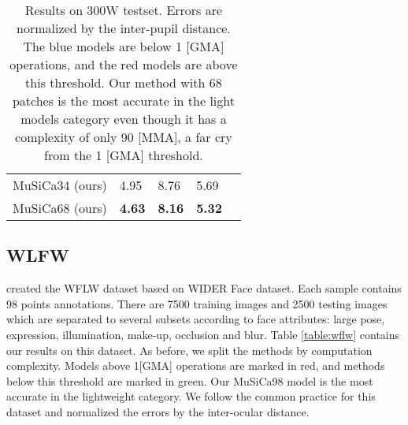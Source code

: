\documentclass[twocolumn]{article}
\begin{document}
\begin{table}[]
\begin{tabular}{@{}llllll@{}}
\multicolumn{2}{l}{MuSiCa34 (ours)}                     & 4.95                                 & 8.76                                 & 5.69                                 & \cellcolor[HTML]{0000FF} \\
\multicolumn{2}{l}{MuSiCa68 (ours)}               & {\textbf{4.63}} & {\textbf{8.16}} & {\textbf{5.32}} & \cellcolor[HTML]{0000FF}                        
\end{tabular}
\caption{Results on 300W testset. Errors are normalized by the inter-pupil distance. The blue models are below 1 [GMA] operations, and the red models are above this threshold. Our method with 68 patches is the most accurate in the light models category even though it has a complexity of only 90 [MMA], a far cry from the 1 [GMA] threshold.}\label{table:300w}
\end{table}



\subsection{WLFW}

\cite{wu2018look} created the WFLW dataset based on WIDER Face \cite{yang2016wider} dataset. Each sample contains 98 points annotations. There are 7500 training images and 2500 testing images which are separated to several subsets according to face attributes: large pose, expression, illumination, make-up, occlusion and blur. Table \ref{table:wflw} contains our results on this dataset. As before, we split the methods by computation complexity. Models above 1[GMA] operations are marked in red, and methods below this threshold are marked in green. Our MuSiCa98 model is the most accurate in the lightweight category. We follow the common practice for this dataset and normalized the errors by the inter-ocular distance.
\end{document}
